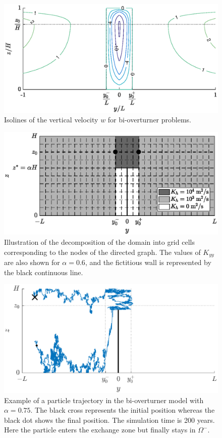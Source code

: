 \begin{figure}[!htp]
	\centering
	\includegraphics[width=\textwidth]{fig/problem2box/w2box_timmermans.eps}
	\caption{Isolines of the vertical velocity $w$ for bi-overturner problems.}
	\label{fig:w2box}
\end{figure}

\begin{figure}[!htp]
	\centering
	\includegraphics[width=\textwidth]{fig/problem2box/problem.eps}
	\caption{Illustration of the decomposition of the domain into grid cells corresponding to the nodes of the directed graph. The values of $K_{yy}$ are also shown for $\alpha = 0.6$, and the fictitious wall is represented by the black continuous line.}
	\label{fig:Kh2box}
\end{figure}

\begin{figure}[!htp]
	\centering
	\includegraphics[width=\textwidth]{fig/problem2box/traj_without_transfer5.eps}
	\caption{Example of a particle trajectory in the bi-overturner model with $\alpha = 0.75$. The black cross represents the initial position whereas the black dot shows the final position. The simulation time is 200 years. Here the particle enters the exchange zone but finally stays in $\Omega^-$.}
	\label{fig:withouttransfer}
\end{figure}

